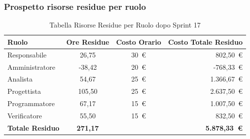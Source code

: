 \subsubsection{Prospetto risorse residue per ruolo}
\begin{table}[H]
    \centering
    \renewcommand{\arraystretch}{1.3}
    \begin{tabularx}{\textwidth}{|X|c|c|r|}
        \hline
        \textbf{Ruolo} & \textbf{Ore Residue} & \textbf{Costo Orario} &
        \textbf{Costo Totale Residuo} \\
        \hline
        Responsabile   & 26,75 & 30~\euro & 802{,}50~\euro \\
        Amministratore & -38,42 & 20~\euro & -768{,}33~\euro \\
        Analista       & 54,67 & 25~\euro & 1.366{,}67~\euro \\
        Progettista    & 105,50 & 25~\euro & 2.637{,}50~\euro \\
        Programmatore  & 67,17 & 15~\euro & 1.007{,}50~\euro \\
        Verificatore   & 55,50 & 15~\euro & 832{,}50~\euro \\
        \hline
        \textbf{Totale Residuo} & \textbf{271,17} & &
        \textbf{5.878{,}33~\euro} \\
        \hline
    \end{tabularx}
    \caption{Tabella Risorse Residue per Ruolo dopo Sprint 17}
\end{table}

